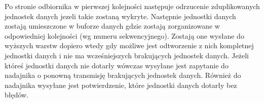 Po stronie odbiornika w pierwszej kolejności następuje odrzucenie zduplikowanych jednostek danych jezeli takie zostaną wykryte. Następnie jednostki danych zostają umieszczone w buforze danych gdzie zostają zorganizowane w odpowiedniej kolejności (wg numeru sekwencyjnego). Zostają one wysłane do wyższych warstw dopiero wtedy gdy możliwe jest odtworzenie z nich kompletnej jednostki danych i nie ma wcześniejszych brakujących jednostek danych. Jeżeli któreś jednostki danych nie dotarły wówczas wysyłane jest zapytanie do nadajnika o ponowną transmisję brakujących jednostek danych. Również do nadajnika wysyłane jest potwierdzenie, które jednostki danych dotarły bez błędów.

